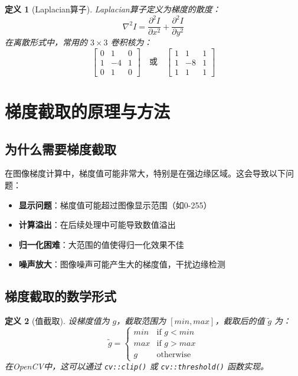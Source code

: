 \documentclass{article}
\newtheorem{definition}{定义}[section]
\begin{document}
\begin{definition}[Laplacian算子]
Laplacian算子定义为梯度的散度：
\[
\nabla^2 I = \frac{\partial^2 I}{\partial x^2} + \frac{\partial^2 I}{\partial y^2}
\]
在离散形式中，常用的 $3 \times 3$ 卷积核为：
\[
\begin{bmatrix}
0 & 1 & 0 \\
1 & -4 & 1 \\
0 & 1 & 0
\end{bmatrix} \quad \text{或} \quad \begin{bmatrix}
1 & 1 & 1 \\
1 & -8 & 1 \\
1 & 1 & 1
\end{bmatrix}
\]
\end{definition}

\section{梯度截取的原理与方法}

\subsection{为什么需要梯度截取}

在图像梯度计算中，梯度值可能非常大，特别是在强边缘区域。这会导致以下问题：

\begin{itemize}
    \item \textbf{显示问题}：梯度值可能超过图像显示范围（如0-255）
    \item \textbf{计算溢出}：在后续处理中可能导致数值溢出
    \item \textbf{归一化困难}：大范围的值使得归一化效果不佳
    \item \textbf{噪声放大}：图像噪声可能产生大的梯度值，干扰边缘检测
\end{itemize}

\subsection{梯度截取的数学形式}

\begin{definition}[值截取]
设梯度值为 $g$，截取范围为 $[min, max]$，截取后的值 $\tilde{g}$ 为：
\[
\tilde{g} = \begin{cases}
min & \text{if } g < min \\
max & \text{if } g > max \\
g & \text{otherwise}
\end{cases}
\]
在OpenCV中，这可以通过 \texttt{cv::clip()} 或 \texttt{cv::threshold()} 函数实现。
\end{definition}
\end{document}
